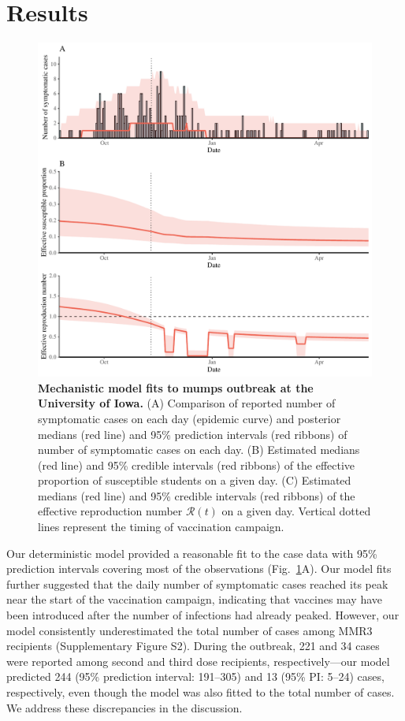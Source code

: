 \documentclass[12pt]{article}
\newcommand{\fref}[1]{Fig.~\ref{fig:#1}}
\begin{document}
\section{Results}

\begin{figure}[!th]
\includegraphics[width=1\textwidth]{../figure_stanfit_seirv_final/figure_stanfit_trajectory.pdf}
\caption{
\textbf{Mechanistic model fits to mumps outbreak at the University of Iowa.}
(A) Comparison of reported number of symptomatic cases on each day (epidemic curve) and posterior medians (red line) and 95\% prediction intervals (red ribbons) of number of symptomatic cases on each day.
(B) Estimated medians (red line) and 95\% credible intervals (red ribbons) of the effective proportion of susceptible students on a given day.
(C) Estimated medians (red line) and 95\% credible intervals (red ribbons) of the effective reproduction number $\mathcal R(t)$ on a given day.
Vertical dotted lines represent the timing of vaccination campaign.
}
\label{fig:fit}
\end{figure}

Our deterministic model provided a reasonable fit to the case data with 95\% prediction intervals covering most of the observations (\fref{fit}A).
Our model fits further suggested that the daily number of symptomatic cases reached its peak near the start of the vaccination campaign, indicating that vaccines may have been introduced after the number of infections had already peaked.
However, our model consistently underestimated the total number of cases among MMR3 recipients (Supplementary Figure S2).
During the outbreak, 221 and 34 cases were reported among second and third dose recipients, respectively---our model predicted 244 (95\% prediction interval: 191--305) and 13 (95\% PI: 5--24) cases, respectively, even though the model was also fitted to the total number of cases.
We address these discrepancies in the discussion.
\end{document}
